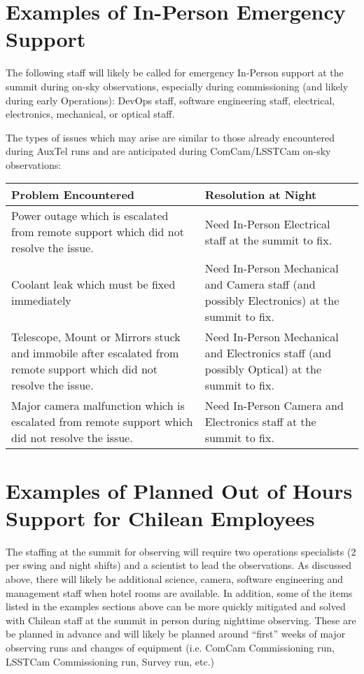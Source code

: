 \section{Examples of In-Person Emergency Support}

The following staff will likely be called for emergency In-Person support at the summit during on-sky observations, especially during commissioning (and likely during early Operations):  DevOps staff, software engineering staff, electrical, electronics, mechanical, or optical staff.

The types of issues which may arise are similar to those already encountered during AuxTel runs and are anticipated during ComCam/LSSTCam on-sky observations:

\begin{longtable}{p{}p{}}\hline
\textbf{Problem Encountered} & \textbf{Resolution at Night}  \\\hline

Power outage which is escalated from remote support which did not resolve the issue.  &  Need In-Person Electrical staff at the summit to fix. \\\hline
Coolant leak which must be fixed immediately  &  Need In-Person Mechanical and Camera staff (and possibly Electronics) at the summit to fix. \\\hline
Telescope, Mount or Mirrors stuck and immobile after escalated from remote support which did not resolve the issue.  &  Need In-Person Mechanical and Electronics staff (and possibly Optical) at the summit to fix. \\\hline
Major camera malfunction which is escalated from remote support which did not resolve the issue. &  Need In-Person Camera and Electronics staff at the summit to fix. \\\hline

\end{longtable}


\section{Examples of Planned Out of Hours Support for Chilean Employees}

The staffing at the summit for observing will require two operations specialists (2 per swing and night shifts) and a scientist to lead the observations.  
As discussed above, there will likely be additional science, camera, software engineering and management staff when hotel rooms are available.  
In addition, some of the items listed in the examples sections above can be more quickly mitigated and solved with Chilean staff at the summit in person during nighttime observing.  
These are be planned in advance and will likely be planned around ``first'' weeks of major observing runs and changes of equipment (i.e. ComCam Commissioning run, LSSTCam Commissioning run, Survey run, etc.)






